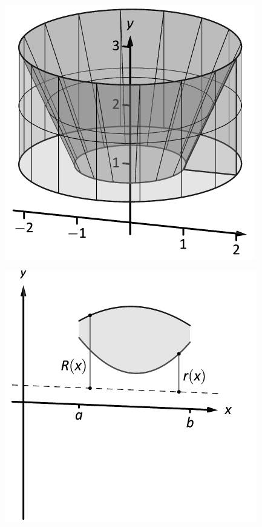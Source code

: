 \documentclass[10pt]{article}
\begin{document}
\includegraphics{figwash2c_3DBW.pdf}
\texttt{}

\includegraphics{figwasher_idea_a_3DBW.pdf}
\texttt{}
\end{document}
